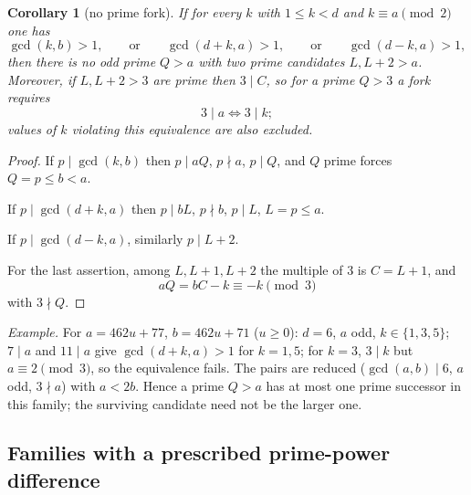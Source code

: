 \documentclass[11pt,reqno]{amsart}
\newtheorem{corollary}[theorem]{Corollary}
\theoremstyle{definition}
\theoremstyle{remark}
\begin{document}
\begin{samepage}
\begin{corollary}[no prime fork]\leavevmode\label{thm:60}
If for every \(k\) with \(1\le k<d\)
and \(k\equiv a\pmod2\) one has
\[
\gcd(k,b)>1,\qquad\text{or}\qquad \gcd(d+k,a)>1,\qquad\text{or}\qquad \gcd(d-k,a)>1,
\]
then there is no odd prime
\(Q>a\) with two prime candidates \(L,L+2>a\). Moreover, if
\(L,L+2>3\) are prime then \(3\mid C\), so for a prime \(Q>3\) a fork
requires
\[
3\mid a\iff3\mid k;
\]
values of \(k\) violating this
equivalence are also excluded.
\label{thm-end:60}
\end{corollary}
\end{samepage}

\begin{proof}\leavevmode\label{proof:60}
If \(p\mid\gcd(k,b)\) then \(p\mid aQ\), \(p\nmid a\),
\(p\mid Q\), and \(Q\) prime forces \(Q=p\le b<a\).

If
\(p\mid\gcd(d+k,a)\) then \(p\mid bL\), \(p\nmid b\), \(p\mid L\),
\(L=p\le a\).

If \(p\mid\gcd(d-k,a)\), similarly \(p\mid L+2\).

For
the last assertion, among \(L,L+1,L+2\) the multiple of \(3\) is
\(C=L+1\), and
\[
aQ=bC-k\equiv-k\pmod3
\]
with \(3\nmid Q\). \qedhere
\end{proof}

\emph{Example.} For \(a=462u+77\), \(b=462u+71\) (\(u\ge0\)): \(d=6\),
\(a\) odd, \(k\in\{1,3,5\}\); \(7\mid a\) and \(11\mid a\) give
\(\gcd(d+k,a)>1\) for \(k=1,5\); for \(k=3\), \(3\mid k\) but
\(a\equiv2\pmod3\), so the equivalence fails. The pairs are reduced
(\(\gcd(a,b)\mid6\), \(a\) odd, \(3\nmid a\)) with \(a<2b\). Hence a
prime \(Q>a\) has at most one prime successor in this family; the
surviving candidate need not be the larger one.

\subsection{Families with a prescribed prime-power difference}\label{sec:C.6}
\end{document}
